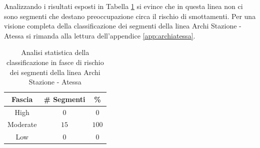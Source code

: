 \newline
Analizzando i risultati esposti in Tabella \ref{percentualearchiatessa} si evince che in questa linea non ci sono segmenti che destano preoccupazione circa il rischio di smottamenti. 
Per una visione completa della classificazione dei segmenti della linea Archi Stazione - Atessa si rimanda alla lettura dell'appendice \ref{app:archiatessa}.
\begin{table}[h]
\centering
\begin{tabular}{|c|c|c|}
\hline \rowcolor{lightgray}
Fascia   & \# Segmenti & \%    \\ \hline \rowcolor{flamingopink}
High     & $0$           & $0$     \\ \hline \rowcolor{icterine}
Moderate & $15$          & $100$ \\ \hline \rowcolor{inchworm}
Low      & $0$          & $0$ \\ \hline
\end{tabular}
\caption{Analisi statistica della classificazione in fasce di rischio dei segmenti della linea Archi Stazione - Atessa}
\label{percentualearchiatessa}
\end{table}
\newpage

